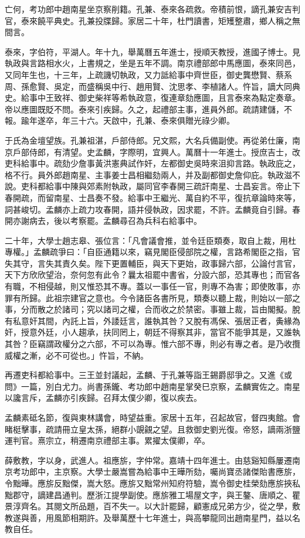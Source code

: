 \begin{pinyinscope}
亡何，考功郎中趙南星坐京察削籍。孔兼、泰來各疏救。帝積前恨，謫孔兼安吉判官，泰來饒平典史。孔兼投牒歸。家居二十年，杜門讀書，矩矱整肅，鄉人稱之無間言。

泰來，字伯符，平湖人。年十九，舉萬曆五年進士，授順天教授，進國子博士。見執政與言路相水火，上書規之，坐是五年不調。南京禮部郎中馬應圖，泰來同邑，又同年生也，十三年，上疏譏切執政，又力詆給事中齊世臣，御史龔懋賢、蔡系周、孫愈賢、吳定，而盛稱吳中行、趙用賢、沈思孝、李植諸人。忤旨，謫大同典史。給事中王致祥、御史柴祥等希執政意，復連章劾應圖，且言泰來為點定奏章。帝以應圖既貶不問。泰來引疾歸。久之，起禮部主事，進員外郎。疏請建儲，不報。踰年遂卒，年三十六。天啟中，孔兼、泰來俱贈光祿少卿。

于氏為金壇望族。孔兼祖湛，戶部侍郎。兄文熙，大名兵備副使。再從弟仕廉，南京戶部侍郎，有清望。史孟麟，字際明，宜興人。萬曆十一年進士。授庶吉士，改吏科給事中。疏劾少詹事黃洪憲典試作奸，左都御史吳時來沮抑言路。執政庇之，格不行。員外郎趙南星、主事姜士昌相繼劾兩人，并及副都御史詹仰庇。執政滋不說。吏科都給事中陳與郊素附執政，屬同官李春開三疏訐南星、士昌妄言。帝止下春開疏，而留南星、士昌奏不發。給事中王繼光、萬自約不平，復抗章論時來等，詞甚峻切。孟麟亦上疏力攻春開，語并侵執政，因求罷，不許。孟麟竟自引歸。春開亦謝病去，後以考察罷。孟麟尋召為兵科右給事中。

二十年，大學士趙志皋、張位言：「凡會議會推，並令廷臣類奏，取自上裁，用杜專權。」孟麟疏爭曰：「自臣通籍以來，竊見閣臣侵部院之權，言路希閣臣之指，官失其守，言失其責久矣。陛下更置輔臣，與天下更始，政事歸六部，公論付言官，天下方欣欣望治，奈何忽有此令？曩太祖罷中書省，分設六部，恐其專也；而官各有職，不相侵越，則又惟恐其不專。蓋以一事任一官，則專不為害；即使敗事，亦罪有所歸。此祖宗建官之意也。今令諸臣各書所見，類奏以聽上裁，則始以一部之事，分而散之於諸司；究以諸司之權，合而收之於禁密。事雖上裁，旨由閣擬。脫有私意奸其間，內託上旨，外諉廷言，誰執其咎？又脫有馮保、張居正者，夤緣為奸，授意外廷，小人趨承，扶同罔上，朝廷不得察其非，當官不能爭其是，又誰執其咎？臣竊謂政權分之六部，不可以為專。惟六部不專，則必有專之者。是乃收攬威權之漸，必不可從也。」忤旨，不納。

再遷吏科都給事中。三王並封議起，孟麟、于孔兼等詣王錫爵邸爭之。又進《或問》一篇，別白尤力。尚書孫鑨、考功郎中趙南星掌癸巳京察，孟麟實佐之。南星以讒言斥，孟麟亦引疾歸。召拜太僕少卿，復以疾去。

孟麟素砥名節，復與東林講會，時望益重。家居十五年，召起故官，督四夷館。會睹梃擊事，疏請冊立皇太孫，絕群小覬覦之望。且救御史劉光復。帝怒，謫兩浙鹽運判官。熹宗立，稍遷南京禮部主事。累擢太僕卿，卒。

薛敷教，字以身，武進人。祖應旂，字仲常。嘉靖十四年進士。由慈谿知縣屢遷南京考功郎中，主京察。大學士嚴嵩嘗為給事中王曄所劾，囑尚寶丞諸傑貽書應旂，令黜曄。應旂反黜傑，嵩大怒。應旂又黜常州知府符驗，嵩令御史桂榮劾應旂挾私黜郡守，謫建昌通判。歷浙江提學副使。應旂雅工場屋文字，與王鏊、唐順之、瞿景淳齊名。其閱文所品題，百不失一。以大計罷歸，顧憲成兄弟方少，從之學，敷教遂與善，用風節相期許。及舉萬歷十七年進士，與高攀龍同出趙南星門，益以名教自任。


\end{pinyinscope}
